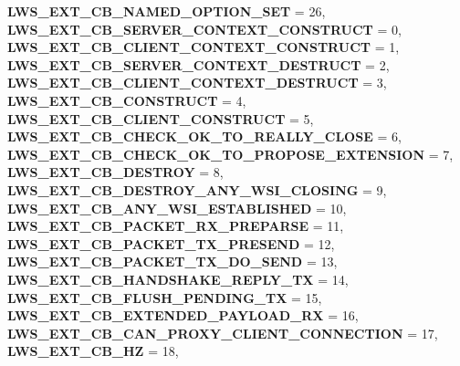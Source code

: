 \begin{DoxyCompactItemize}
\newline
{\bfseries L\+W\+S\+\_\+\+E\+X\+T\+\_\+\+C\+B\+\_\+\+N\+A\+M\+E\+D\+\_\+\+O\+P\+T\+I\+O\+N\+\_\+\+S\+ET} = 26, 
{\bfseries L\+W\+S\+\_\+\+E\+X\+T\+\_\+\+C\+B\+\_\+\+S\+E\+R\+V\+E\+R\+\_\+\+C\+O\+N\+T\+E\+X\+T\+\_\+\+C\+O\+N\+S\+T\+R\+U\+CT} = 0, 
{\bfseries L\+W\+S\+\_\+\+E\+X\+T\+\_\+\+C\+B\+\_\+\+C\+L\+I\+E\+N\+T\+\_\+\+C\+O\+N\+T\+E\+X\+T\+\_\+\+C\+O\+N\+S\+T\+R\+U\+CT} = 1, 
{\bfseries L\+W\+S\+\_\+\+E\+X\+T\+\_\+\+C\+B\+\_\+\+S\+E\+R\+V\+E\+R\+\_\+\+C\+O\+N\+T\+E\+X\+T\+\_\+\+D\+E\+S\+T\+R\+U\+CT} = 2, 
\newline
{\bfseries L\+W\+S\+\_\+\+E\+X\+T\+\_\+\+C\+B\+\_\+\+C\+L\+I\+E\+N\+T\+\_\+\+C\+O\+N\+T\+E\+X\+T\+\_\+\+D\+E\+S\+T\+R\+U\+CT} = 3, 
{\bfseries L\+W\+S\+\_\+\+E\+X\+T\+\_\+\+C\+B\+\_\+\+C\+O\+N\+S\+T\+R\+U\+CT} = 4, 
{\bfseries L\+W\+S\+\_\+\+E\+X\+T\+\_\+\+C\+B\+\_\+\+C\+L\+I\+E\+N\+T\+\_\+\+C\+O\+N\+S\+T\+R\+U\+CT} = 5, 
{\bfseries L\+W\+S\+\_\+\+E\+X\+T\+\_\+\+C\+B\+\_\+\+C\+H\+E\+C\+K\+\_\+\+O\+K\+\_\+\+T\+O\+\_\+\+R\+E\+A\+L\+L\+Y\+\_\+\+C\+L\+O\+SE} = 6, 
\newline
{\bfseries L\+W\+S\+\_\+\+E\+X\+T\+\_\+\+C\+B\+\_\+\+C\+H\+E\+C\+K\+\_\+\+O\+K\+\_\+\+T\+O\+\_\+\+P\+R\+O\+P\+O\+S\+E\+\_\+\+E\+X\+T\+E\+N\+S\+I\+ON} = 7, 
{\bfseries L\+W\+S\+\_\+\+E\+X\+T\+\_\+\+C\+B\+\_\+\+D\+E\+S\+T\+R\+OY} = 8, 
{\bfseries L\+W\+S\+\_\+\+E\+X\+T\+\_\+\+C\+B\+\_\+\+D\+E\+S\+T\+R\+O\+Y\+\_\+\+A\+N\+Y\+\_\+\+W\+S\+I\+\_\+\+C\+L\+O\+S\+I\+NG} = 9, 
{\bfseries L\+W\+S\+\_\+\+E\+X\+T\+\_\+\+C\+B\+\_\+\+A\+N\+Y\+\_\+\+W\+S\+I\+\_\+\+E\+S\+T\+A\+B\+L\+I\+S\+H\+ED} = 10, 
\newline
{\bfseries L\+W\+S\+\_\+\+E\+X\+T\+\_\+\+C\+B\+\_\+\+P\+A\+C\+K\+E\+T\+\_\+\+R\+X\+\_\+\+P\+R\+E\+P\+A\+R\+SE} = 11, 
{\bfseries L\+W\+S\+\_\+\+E\+X\+T\+\_\+\+C\+B\+\_\+\+P\+A\+C\+K\+E\+T\+\_\+\+T\+X\+\_\+\+P\+R\+E\+S\+E\+ND} = 12, 
{\bfseries L\+W\+S\+\_\+\+E\+X\+T\+\_\+\+C\+B\+\_\+\+P\+A\+C\+K\+E\+T\+\_\+\+T\+X\+\_\+\+D\+O\+\_\+\+S\+E\+ND} = 13, 
{\bfseries L\+W\+S\+\_\+\+E\+X\+T\+\_\+\+C\+B\+\_\+\+H\+A\+N\+D\+S\+H\+A\+K\+E\+\_\+\+R\+E\+P\+L\+Y\+\_\+\+TX} = 14, 
\newline
{\bfseries L\+W\+S\+\_\+\+E\+X\+T\+\_\+\+C\+B\+\_\+\+F\+L\+U\+S\+H\+\_\+\+P\+E\+N\+D\+I\+N\+G\+\_\+\+TX} = 15, 
{\bfseries L\+W\+S\+\_\+\+E\+X\+T\+\_\+\+C\+B\+\_\+\+E\+X\+T\+E\+N\+D\+E\+D\+\_\+\+P\+A\+Y\+L\+O\+A\+D\+\_\+\+RX} = 16, 
{\bfseries L\+W\+S\+\_\+\+E\+X\+T\+\_\+\+C\+B\+\_\+\+C\+A\+N\+\_\+\+P\+R\+O\+X\+Y\+\_\+\+C\+L\+I\+E\+N\+T\+\_\+\+C\+O\+N\+N\+E\+C\+T\+I\+ON} = 17, 
{\bfseries L\+W\+S\+\_\+\+E\+X\+T\+\_\+\+C\+B\+\_\+HZ} = 18, 

\end{DoxyCompactItemize}
